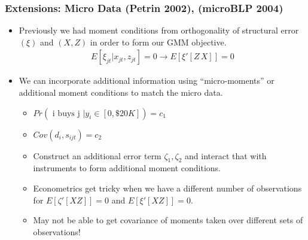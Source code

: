 \documentclass[xcolor=pdftex,dvipsnames,table,mathserif,aspectratio=169]{beamer}
\begin{document}
\begin{frame} \frametitle{Extensions: Micro Data (Petrin 2002), (microBLP 2004)}
\begin{itemize}
\item Previously we had moment conditions from orthogonality of structural error $(\xi)$ and $(X,Z)$ in order to form our GMM objective.
\begin{eqnarray*}
E[\xi_{jt} | x_{jt}, z_{jt}]=0 \rightarrow E[\xi'  [Z \, X]]=0
\end{eqnarray*}
\item We can incorporate additional information using ``micro-moments'' or additional moment conditions to match the micro data.
\begin{itemize}
\item $Pr(\mbox{ i buys j } | y_i \in [0,\$20K])= c_1$
\item $Cov(d_i, s_{ijt}) = c_2$
\item Construct an additional error term $\zeta_1,\zeta_2$ and interact that with instruments to form additional moment conditions.
\item Econometrics get tricky when we have a different number of observations for $E[\zeta' [X Z]]=0$ and $E[\xi' [X Z]]=0$.
\item May not be able to get covariance of moments taken over different sets of observations!
\end{itemize}
\end{itemize}
\end{frame}
\end{document}

